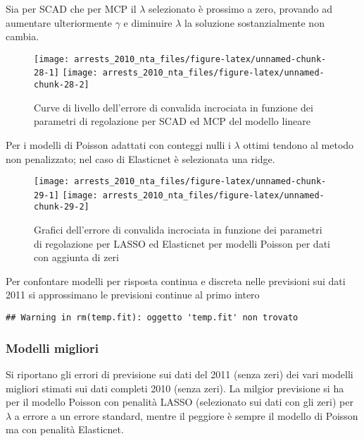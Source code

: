 \documentclass[
  ,
]{article}
\begin{document}
Sia per SCAD che per MCP il \(\lambda\) selezionato è prossimo a zero, provando ad aumentare ulteriormente \(\gamma\) e diminuire \(\lambda\) la soluzione sostanzialmente non cambia.

\begin{figure}

{\centering \texttt{[image: arrests\_2010\_nta\_files/figure-latex/unnamed-chunk-28-1]} \texttt{[image: arrests\_2010\_nta\_files/figure-latex/unnamed-chunk-28-2]} 

}

\caption{Curve di livello dell'errore di convalida incrociata in funzione dei parametri di regolazione per SCAD ed MCP del modello lineare}\label{fig:unnamed-chunk-28}
\end{figure}

Per i modelli di Poisson adattati con conteggi nulli i \(\lambda\) ottimi tendono al metodo non penalizzato; nel caso di Elasticnet è selezionata una ridge.

\begin{figure}

{\centering \texttt{[image: arrests\_2010\_nta\_files/figure-latex/unnamed-chunk-29-1]} \texttt{[image: arrests\_2010\_nta\_files/figure-latex/unnamed-chunk-29-2]} 

}

\caption{Grafici dell'errore di convalida incrociata in funzione dei parametri di regolazione per LASSO ed Elasticnet per modelli Poisson per dati con aggiunta di zeri}\label{fig:unnamed-chunk-29}
\end{figure}

Per confontare modelli per risposta continua e discreta nelle previsioni sui dati 2011 si approssimano le previsioni continue al primo intero

\begin{verbatim}
## Warning in rm(temp.fit): oggetto 'temp.fit' non trovato
\end{verbatim}

\hypertarget{modelli-migliori}{%
\subsubsection{Modelli migliori}\label{modelli-migliori}}

Si riportano gli errori di previsione sui dati del 2011 (senza zeri) dei vari modelli migliori stimati sui dati completi 2010 (senza zeri). La milgior previsione si ha per il modello Poisson con penalità LASSO (selezionato sui dati con gli zeri) per \(\lambda\) a errore a un errore standard, mentre il peggiore è sempre il modello di Poisson ma con penalità Elasticnet.
\end{document}
